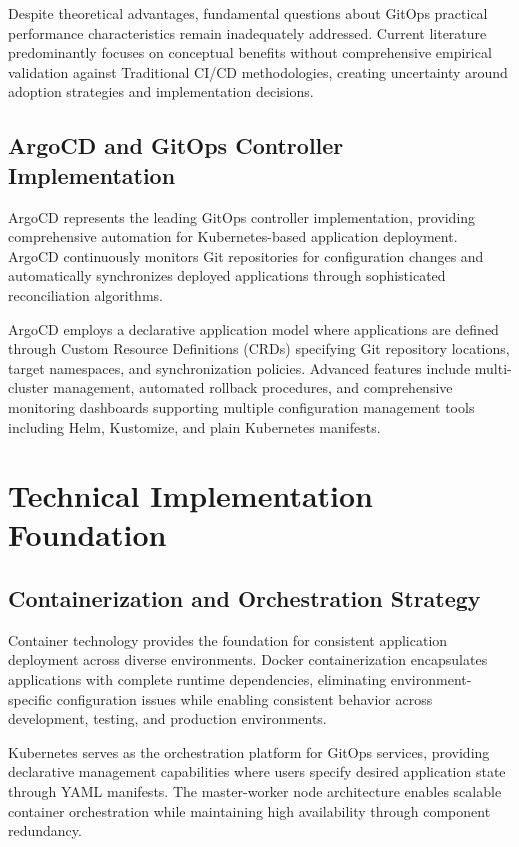 Despite theoretical advantages, fundamental questions about GitOps practical performance characteristics remain inadequately addressed. Current literature predominantly focuses on conceptual benefits without comprehensive empirical validation against Traditional CI/CD methodologies, creating uncertainty around adoption strategies and implementation decisions.

\subsection{ArgoCD and GitOps Controller Implementation}

ArgoCD represents the leading GitOps controller implementation, providing comprehensive automation for Kubernetes-based application deployment. ArgoCD continuously monitors Git repositories for configuration changes and automatically synchronizes deployed applications through sophisticated reconciliation algorithms.

ArgoCD employs a declarative application model where applications are defined through Custom Resource Definitions (CRDs) specifying Git repository locations, target namespaces, and synchronization policies. Advanced features include multi-cluster management, automated rollback procedures, and comprehensive monitoring dashboards supporting multiple configuration management tools including Helm, Kustomize, and plain Kubernetes manifests.

\section{Technical Implementation Foundation}

\subsection{Containerization and Orchestration Strategy}

Container technology provides the foundation for consistent application deployment across diverse environments. Docker containerization encapsulates applications with complete runtime dependencies, eliminating environment-specific configuration issues while enabling consistent behavior across development, testing, and production environments.

Kubernetes serves as the orchestration platform for GitOps services, providing declarative management capabilities where users specify desired application state through YAML manifests. The master-worker node architecture enables scalable container orchestration while maintaining high availability through component redundancy.


